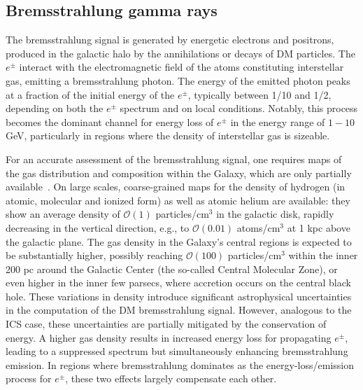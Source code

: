 \subsection{Bremsstrahlung gamma rays}
\label{sec:bremgammas}

The bremsstrahlung signal is generated by energetic electrons and positrons, produced in the galactic halo by the annihilations or decays of DM particles. The $e^\pm$ interact with the electromagnetic field of the atoms constituting interstellar gas, emitting a bremsstrahlung photon. The energy of the emitted photon peaks  at a fraction of the initial energy of the $e^\pm$, typically between 1/10 and 1/2, depending on  both the $e^\pm$ spectrum and on local conditions. 
Notably, this process becomes the dominant channel for energy loss of $e^\pm$ in the energy range of $1-10$ GeV, particularly in regions where the density of interstellar gas is sizeable.


For an accurate assessment of the bremsstrahlung signal, one requires maps of the gas distribution and composition within the Galaxy, which are only partially available~\cite{gasmaps}.
On large scales, coarse-grained maps for the density of hydrogen (in atomic, molecular and ionized form) as well as atomic helium are available: they show an average density of $\mathcal{O}(1)$ particles/cm$^3$
in the galactic disk, rapidly decreasing in the vertical direction, e.g., to $\mathcal{O}(0.01)$ atoms/cm$^3$ at 1 kpc above the galactic plane.
The gas density in the Galaxy's central regions is expected to be substantially higher, possibly reaching $\mathcal{O}(100)$ particles/cm$^3$ within the inner 200 pc around the Galactic Center (the so-called Central Molecular Zone), or even higher in the inner few parsecs, where accretion occurs on the central black hole.  
These variations in density introduce significant astrophysical uncertainties in the computation of the DM bremsstrahlung signal. However, analogous to the ICS case, these uncertainties are partially mitigated by the conservation of energy. A higher gas density results in increased energy loss for propagating $e^\pm$, leading to a suppressed spectrum but simultaneously enhancing bremsstrahlung emission. In regions where bremsstrahlung dominates as the energy-loss/emission process for $e^\pm$, these two effects largely compensate each other.


\medskip

